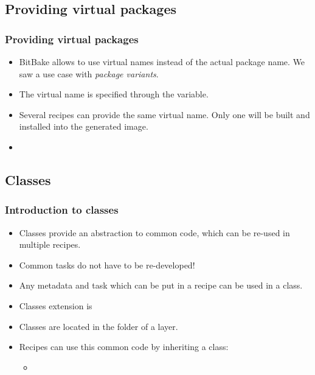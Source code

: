 \subsection{Providing virtual packages}

\begin{frame}
  \frametitle{Providing virtual packages}
  \begin{itemize}
    \item BitBake allows to use virtual names instead of the actual
          package name. We saw a use case with \emph{package
          variants}.
    \item The virtual name is specified through the 
          variable.
    \item Several recipes can provide the same virtual name. Only one
          will be built and installed into the generated image.
    \item {}
  \end{itemize}
\end{frame}

\subsection{Classes}

\begin{frame}
  \frametitle{Introduction to classes}
  \begin{itemize}
    \item Classes provide an abstraction to common code, which can be
          re-used in multiple recipes.
    \item Common tasks do not have to be re-developed!
    \item Any metadata and task which can be put in a recipe can be
          used in a class.
    \item Classes extension is 
    \item Classes are located in the  folder of a layer.
    \item Recipes can use this common code by inheriting a class:
    \begin{itemize}
      \item {}
    \end{itemize}
  \end{itemize}
\end{frame}

